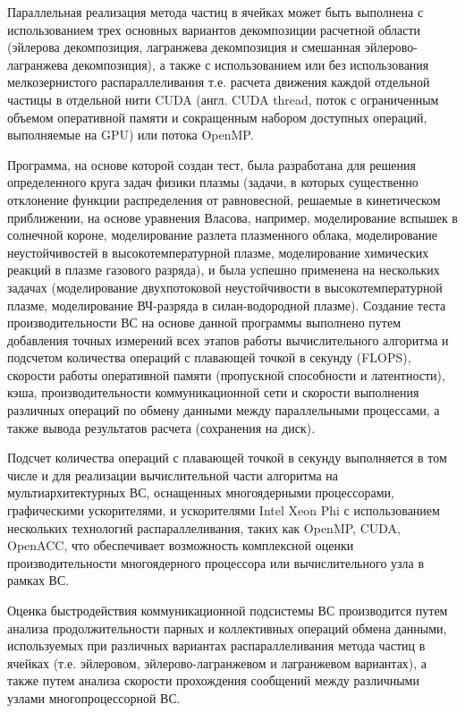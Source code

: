 Параллельная реализация метода частиц в ячейках может быть выполнена с использованием трех основных вариантов декомпозиции расчетной области (эйлерова декомпозиция, лагранжева декомпозиция и смешанная эйлерово-лагранжева декомпозиция), а также с использованием или без использования мелкозернистого распараллеливания т.е. расчета движения каждой отдельной частицы в отдельной нити CUDA (англ. CUDA thread, поток с ограниченным объемом оперативной памяти и сокращенным набором доступных операций, выполняемые на GPU) или потока OpenMP. 

Программа, на основе которой создан тест, была разработана для решения определенного круга задач физики плазмы (задачи, в которых существенно отклонение функции распределения от равновесной, решаемые в кинетическом приближении, на основе уравнения Власова, например, моделирование вспышек в солнечной короне, моделирование разлета плазменного облака, моделирование неустойчивостей в высокотемпературной плазме, моделирование химических реакций в плазме газового разряда), и была успешно применена на нескольких задачах (моделирование двухпотоковой неустойчивости в высокотемпературной плазме, моделирование ВЧ-разряда в силан-водородной плазме). Создание теста производительности ВС на основе данной программы выполнено путем добавления точных измерений всех этапов работы вычислительного алгоритма и подсчетом количества операций с плавающей точкой в секунду (FLOPS), скорости работы оперативной памяти (пропускной способности и латентности), кэша, производительности коммуникационной сети и скорости выполнения различных операций по обмену данными между параллельными процессами, а также вывода результатов расчета (сохранения на диск).

Подсчет количества операций с плавающей точкой в секунду выполняется в том числе и  для реализации вычислительной части алгоритма на мультиархитектурных ВС, оснащенных многоядерными процессорами, графическими ускорителями, и ускорителями Intel Xeon Phi с использованием нескольких технологий распараллеливания, таких как OpenMP, CUDA, OpenACC, что обеспечивает возможность комплексной оценки производительности многоядерного  процессора или вычислительного узла в рамках ВС.

Оценка быстродействия коммуникационной подсистемы ВС производится путем анализа продолжительности парных и коллективных операций обмена данными, используемых при различных вариантах распараллеливания метода частиц в ячейках (т.е. эйлеровом, эйлерово-лагранжевом и лагранжевом вариантах), а также путем анализа скорости прохождения сообщений между различными узлами многопроцессорной ВС.    

